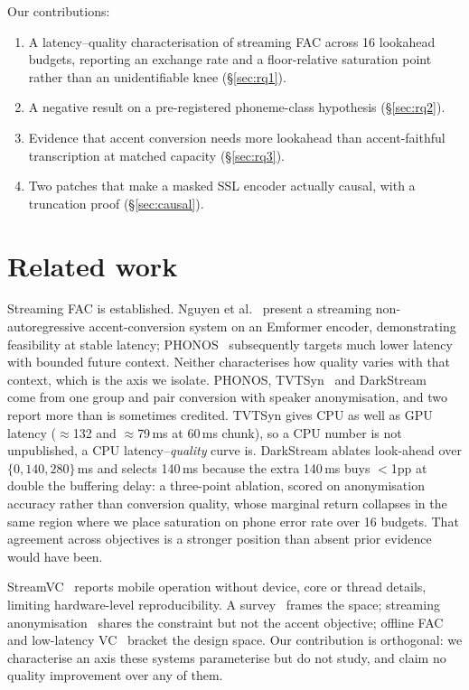 \documentclass{article}
\begin{document}
Our contributions:
\begin{enumerate}\itemsep1pt
\item A latency--quality characterisation of streaming FAC across 16 lookahead
      budgets, reporting an exchange rate and a floor-relative saturation
      point rather than an unidentifiable knee (\S\ref{sec:rq1}).
\item A negative result on a pre-registered phoneme-class hypothesis
      (\S\ref{sec:rq2}).
\item Evidence that accent conversion needs more lookahead than
      accent-faithful transcription at matched capacity (\S\ref{sec:rq3}).
\item Two patches that make a masked SSL encoder actually causal, with a
      truncation proof (\S\ref{sec:causal}).
\end{enumerate}

\section{Related work}

Streaming FAC is established. Nguyen et al.~\cite{nguyen2025streaming} present
a streaming non-autoregressive accent-conversion system on an Emformer encoder,
demonstrating feasibility at stable latency; PHONOS~\cite{phonos2026}
subsequently targets much lower latency with bounded future context. Neither
characterises how quality varies with that context, which is the axis we
isolate. PHONOS, TVTSyn~\cite{tvtsyn2026} and DarkStream~\cite{darkstream2025}
come from one group and pair conversion with speaker anonymisation, and two
report more than is sometimes credited. TVTSyn gives CPU as well as GPU latency
($\approx$132 and $\approx$79\,ms at 60\,ms chunk), so a CPU number is not
unpublished, a CPU latency--\emph{quality} curve is. DarkStream ablates
look-ahead over $\{0,140,280\}$\,ms and selects 140\,ms because the extra
140\,ms buys $<$1pp at double the buffering delay: a three-point ablation,
scored on anonymisation accuracy rather than conversion quality, whose marginal
return collapses in the same region where we place saturation on phone error
rate over 16 budgets. That agreement across objectives is a stronger position
than absent prior evidence would have been.

StreamVC~\cite{streamvc2024} reports mobile operation without device, core or
thread details, limiting hardware-level reproducibility. A
survey~\cite{acsurvey2026} frames the space; streaming
anonymisation~\cite{streamvoiceanon2026, streamvoiceanonplus2026, e2eanon2024}
shares the constraint but not the accent objective; offline
FAC~\cite{zhao2021fac, accentron2022} and low-latency VC~\cite{llvc2023}
bracket the design space. Our contribution is orthogonal: we characterise an
axis these systems parameterise but do not study, and claim no quality
improvement over any of them.
\end{document}
